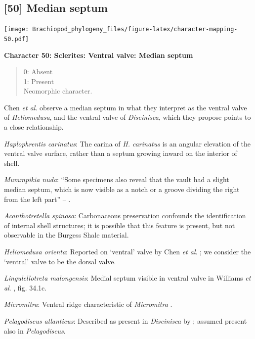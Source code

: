 \documentclass[openany]{book}
\theoremstyle{definition}
\theoremstyle{definition}
\theoremstyle{definition}
\theoremstyle{remark}
\begin{document}
\hypertarget{median-septum}{%
\subsection*{{[}50{]} Median septum}\label{median-septum}}

\texttt{[image: Brachiopod\_phylogeny\_files/figure-latex/character-mapping-50.pdf]}

\textbf{Character 50: Sclerites: Ventral valve: Median septum}

\begin{quote}
0: Absent\\
1: Present\\
Neomorphic character.
\end{quote}

Chen \emph{et al}. \citeyearpar{Chen2007Reinterpretationof} observe a
median septum in what they interpret as the ventral valve of
\emph{Heliomedusa}, and the ventral valve of \emph{Discinisca}, which
they propose points to a close relationship.

\emph{Haplophrentis carinatus}: The carina of \emph{H. carinatus} is an
angular elevation of the ventral valve surface, rather than a septum
growing inward on the interior of shell.

\emph{Mummpikia nuda}: ``Some specimens also reveal that the vault had a
slight median septum, which is now visible as a notch or a groove
dividing the right from the left part'' --
\citet{Balthasar2008iMummpikia}.

\emph{Acanthotretella spinosa}: Carbonaceous preservation confounds the
identification of internal shell structures; it is possible that this
feature is present, but not observable in the Burgess Shale material.

\emph{Heliomedusa orienta}: Reported on `ventral' valve by Chen \emph{et
al}. \citeyearpar{Chen2007Reinterpretationof}; we consider the `ventral'
valve to be the dorsal valve.

\emph{Lingulellotreta malongensis}: Medial septum visible in ventral
valve in Williams \emph{et al}.
\citeyearpar{Williams2000BrachiopodaLinguliformea}, fig. 34.1c.

\emph{Micromitra}: Ventral ridge characteristic of \emph{Micromitra}
\citep{Skovsted2010EarlyCambrian}.

\emph{Pelagodiscus atlanticus}: Described as present in
\emph{Discinisca} by \citet{Chen2007Reinterpretationof}; assumed present
also in \emph{Pelagodiscus}.
\end{document}
